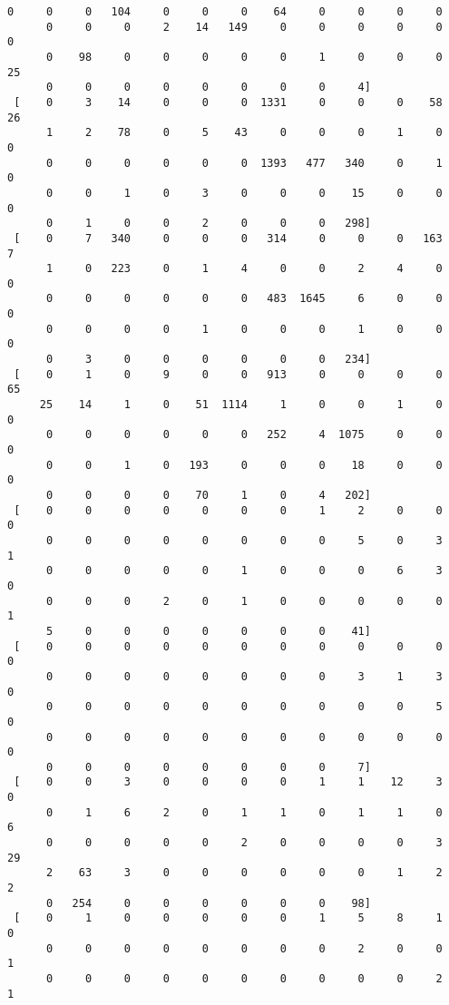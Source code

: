 \documentclass[11pt]{article}
\begin{document}
\begin{Verbatim}[commandchars=\\\{\}]
      0     0     0   104     0     0     0    64     0     0     0     0
      0     0     0     2    14   149     0     0     0     0     0     0
      0    98     0     0     0     0     0     1     0     0     0    25
      0     0     0     0     0     0     0     0     4]
 [    0     3    14     0     0     0  1331     0     0     0    58    26
      1     2    78     0     5    43     0     0     0     1     0     0
      0     0     0     0     0     0  1393   477   340     0     1     0
      0     0     1     0     3     0     0     0    15     0     0     0
      0     1     0     0     2     0     0     0   298]
 [    0     7   340     0     0     0   314     0     0     0   163     7
      1     0   223     0     1     4     0     0     2     4     0     0
      0     0     0     0     0     0   483  1645     6     0     0     0
      0     0     0     0     1     0     0     0     1     0     0     0
      0     3     0     0     0     0     0     0   234]
 [    0     1     0     9     0     0   913     0     0     0     0    65
     25    14     1     0    51  1114     1     0     0     1     0     0
      0     0     0     0     0     0   252     4  1075     0     0     0
      0     0     1     0   193     0     0     0    18     0     0     0
      0     0     0     0    70     1     0     4   202]
 [    0     0     0     0     0     0     0     1     2     0     0     0
      0     0     0     0     0     0     0     0     5     0     3     1
      0     0     0     0     0     1     0     0     0     6     3     0
      0     0     0     2     0     1     0     0     0     0     0     1
      5     0     0     0     0     0     0     0    41]
 [    0     0     0     0     0     0     0     0     0     0     0     0
      0     0     0     0     0     0     0     0     3     1     3     0
      0     0     0     0     0     0     0     0     0     0     5     0
      0     0     0     0     0     0     0     0     0     0     0     0
      0     0     0     0     0     0     0     0     7]
 [    0     0     3     0     0     0     0     1     1    12     3     0
      0     1     6     2     0     1     1     0     1     1     0     6
      0     0     0     0     0     2     0     0     0     0     3    29
      2    63     3     0     0     0     0     0     0     1     2     2
      0   254     0     0     0     0     0     0    98]
 [    0     1     0     0     0     0     0     1     5     8     1     0
      0     0     0     0     0     0     0     0     2     0     0     1
      0     0     0     0     0     0     0     0     0     0     2     1

\end{Verbatim}
\end{document}
